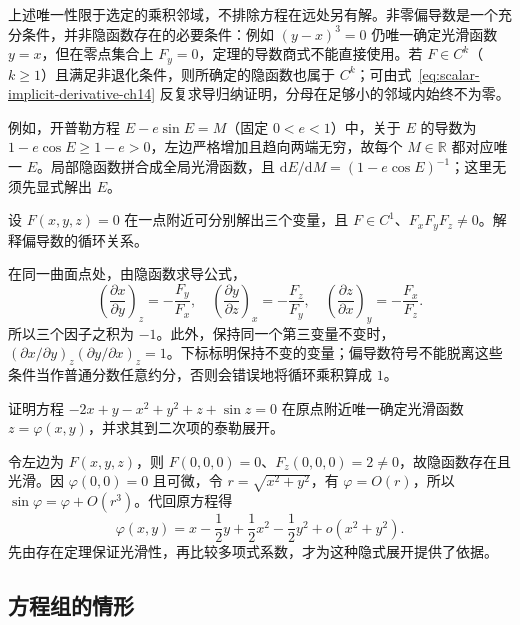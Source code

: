 \documentclass[UTF8,12pt,a4paper,fontset=fandol]{ctexbook}
\begin{document}
上述唯一性限于选定的乘积邻域，不排除方程在远处另有解。非零偏导数是一个充分条件，并非隐函数存在的必要条件：例如 $(y-x)^3=0$ 仍唯一确定光滑函数 $y=x$，但在零点集合上 $F_y=0$，定理的导数商式不能直接使用。若 $F\in C^k$（$k\geq1$）且满足非退化条件，则所确定的隐函数也属于 $C^k$；可由式~\eqref{eq:scalar-implicit-derivative-ch14} 反复求导归纳证明，分母在足够小的邻域内始终不为零。

例如，开普勒方程 $E-e\sin E=M$（固定 $0<e<1$）中，关于 $E$ 的导数为 $1-e\cos E\geq1-e>0$，左边严格增加且趋向两端无穷，故每个 $M\in\mathbb R$ 都对应唯一 $E$。局部隐函数拼合成全局光滑函数，且 $\mathrm dE/\mathrm dM=(1-e\cos E)^{-1}$；这里无须先显式解出 $E$。

\begin{example}
\label{ex:cyclic-partial-derivative-ch14}
设 $F(x,y,z)=0$ 在一点附近可分别解出三个变量，且 $F\in C^1$、$F_xF_yF_z\ne0$。解释偏导数的循环关系。
\end{example}
\begin{solve}
在同一曲面点处，由隐函数求导公式，
\[
    \left(\frac{\partial x}{\partial y}\right)_z=-\frac{F_y}{F_x},\quad
    \left(\frac{\partial y}{\partial z}\right)_x=-\frac{F_z}{F_y},\quad
    \left(\frac{\partial z}{\partial x}\right)_y=-\frac{F_x}{F_z}.
\]
所以三个因子之积为 $-1$。此外，保持同一个第三变量不变时，$\left(\partial x/\partial y\right)_z\left(\partial y/\partial x\right)_z=1$。下标标明保持不变的变量；偏导数符号不能脱离这些条件当作普通分数任意约分，否则会错误地将循环乘积算成 $1$。
\end{solve}

\begin{example}
\label{ex:implicit-taylor-expansion-ch14}
证明方程 $-2x+y-x^2+y^2+z+\sin z=0$ 在原点附近唯一确定光滑函数 $z=\varphi(x,y)$，并求其到二次项的泰勒展开。
\end{example}
\begin{solve}
令左边为 $F(x,y,z)$，则 $F(0,0,0)=0$、$F_z(0,0,0)=2\ne0$，故隐函数存在且光滑。因 $\varphi(0,0)=0$ 且可微，令 $r=\sqrt{x^2+y^2}$，有 $\varphi=O(r)$，所以 $\sin\varphi=\varphi+O(r^3)$。代回原方程得
\[
    \varphi(x,y)=x-\frac12y+\frac12x^2-\frac12y^2+o(x^2+y^2).
\]
先由存在定理保证光滑性，再比较多项式系数，才为这种隐式展开提供了依据。
\end{solve}

\subsection{方程组的情形}
\label{subsec:implicit-functions-for-equation-systems}
\end{document}
